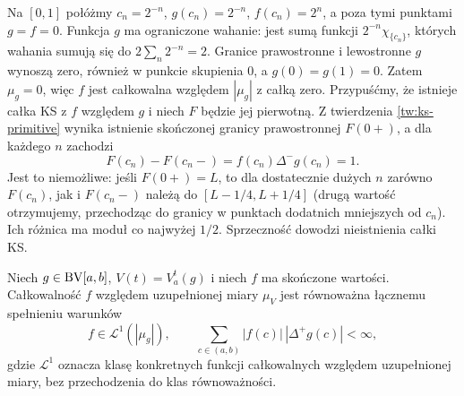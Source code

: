 \begin{przyklad}\label{ma1:kh:ex:ks-cancelled-spikes}
Na $[0,1]$ połóżmy $c_n=2^{-n}$, $g(c_n)=2^{-n}$, $f(c_n)=2^n$, a poza tymi punktami $g=f=0$. Funkcja $g$ ma ograniczone wahanie: jest sumą funkcji $2^{-n}\chi_{\{c_n\}}$, których wahania sumują się do $2\sum_n2^{-n}=2$. Granice prawostronne i lewostronne $g$ wynoszą zero, również w punkcie skupienia $0$, a $g(0)=g(1)=0$. Zatem $\mu_g=0$, więc $f$ jest całkowalna względem $|\mu_g|$ z całką zero.
Przypuśćmy, że istnieje całka KS z $f$ względem $g$ i niech $F$ będzie jej pierwotną. Z twierdzenia \ref{tw:ks-primitive} wynika istnienie skończonej granicy prawostronnej $F(0+)$, a dla każdego $n$ zachodzi
\[
 F(c_n)-F(c_n-)=f(c_n)\Delta^-g(c_n)=1.
\]
Jest to niemożliwe: jeśli $F(0+)=L$, to dla dostatecznie dużych $n$ zarówno $F(c_n)$, jak i $F(c_n-)$ należą do $[L-1/4,L+1/4]$ (drugą wartość otrzymujemy, przechodząc do granicy w punktach dodatnich mniejszych od $c_n$). Ich różnica ma moduł co najwyżej $1/2$. Sprzeczność dowodzi nieistnienia całki KS.
\end{przyklad}
\begin{twierdzenie}\label{ma1:kh:thm:ks-measure-criteria-equivalence}
Niech $g\in\mathrm{BV}[a,b]$, $V(t)=V_a^t(g)$ i niech $f$ ma skończone wartości. Całkowalność $f$ względem uzupełnionej miary $\mu_V$ jest równoważna łącznemu spełnieniu warunków
\[
 f\in\mathcal L^1(|\mu_g|),\qquad
 \sum_{c\in(a,b)}|f(c)|\,|\Delta^+g(c)|<\infty,
\]
gdzie $\mathcal L^1$ oznacza klasę konkretnych funkcji całkowalnych względem uzupełnionej miary, bez przechodzenia do klas równoważności.
\end{twierdzenie}
